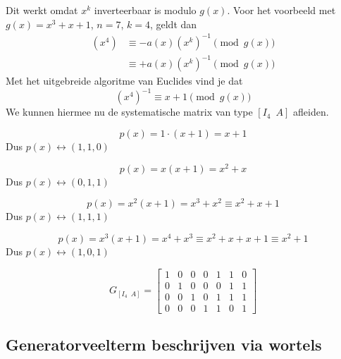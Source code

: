 Dit werkt omdat $x^k$ inverteerbaar is modulo $g(x)$. Voor het voorbeeld met $g(x) = x^3 + x + 1$, $n=7$, $k=4$, geldt dan
\begin{equation*}
    \begin{aligned}
        \left(x^4\right) &\equiv -a(x)\left(x^k\right)^{-1} \pmod {g(x)} \\
        &\equiv +a(x)\left(x^k\right)^{-1} \pmod {g(x)}
    \end{aligned}
\end{equation*}
Met het uitgebreide algoritme van Euclides vind je dat
\begin{equation*}
    \left(x^4\right)^{-1} \equiv x+1 \pmod {g(x)}
\end{equation*}
We kunnen hiermee nu de systematische matrix van type $\left[I_4 \;\ A\right]$ afleiden.

\begin{equation*}
    p(x) = 1 \cdot (x+1) = x+1
\end{equation*}
Dus $p(x) \longleftrightarrow (1, 1, 0)$

\begin{equation*}
    p(x) = x(x+1) = x^2+x
\end{equation*}
Dus $p(x) \longleftrightarrow (0, 1, 1)$

\begin{equation*}
    p(x) = x^2(x+1) = x^3+x^2 \equiv x^2 + x + 1
\end{equation*}
Dus $p(x) \longleftrightarrow (1, 1, 1)$

\begin{equation*}
    p(x) = x^3(x+1) = x^4+x^3 \equiv x^2 + x + x + 1 \equiv x^2 + 1
\end{equation*}
Dus $p(x) \longleftrightarrow (1, 0, 1)$

\begin{equation*}
    G_{\left[I_4 \;\ A\right]} = \left[
        \begin{array}{cccc|ccc}
        1 & 0 & 0 & 0 & 1 & 1 & 0 \\
        0 & 1 & 0 & 0 & 0 & 1 & 1 \\
        0 & 0 & 1 & 0 & 1 & 1 & 1 \\
        0 & 0 & 0 & 1 & 1 & 0 & 1
    \end{array}
    \right]
\end{equation*}

\subsection{Generatorveelterm beschrijven via wortels}

